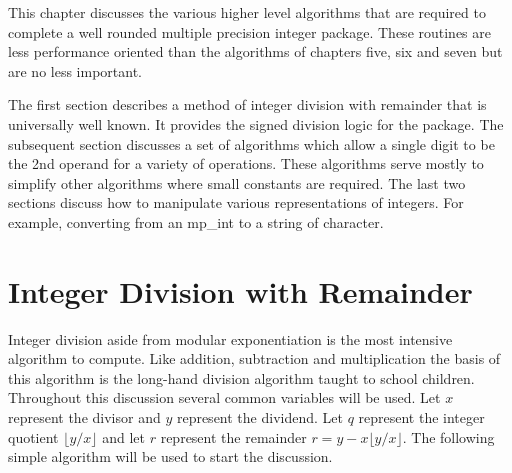 \documentclass[b5paper]{book}
\begin{document}
This chapter discusses the various higher level algorithms that are required to complete a well rounded multiple precision integer package.  These
routines are less performance oriented than the algorithms of chapters five, six and seven but are no less important.  

The first section describes a method of integer division with remainder that is universally well known.  It provides the signed division logic
for the package.  The subsequent section discusses a set of algorithms which allow a single digit to be the 2nd operand for a variety of operations.  
These algorithms serve mostly to simplify other algorithms where small constants are required.  The last two sections discuss how to manipulate 
various representations of integers.  For example, converting from an mp\_int to a string of character.

\section{Integer Division with Remainder}
\label{sec:division}

Integer division aside from modular exponentiation is the most intensive algorithm to compute.  Like addition, subtraction and multiplication
the basis of this algorithm is the long-hand division algorithm taught to school children.  Throughout this discussion several common variables
will be used.  Let $x$ represent the divisor and $y$ represent the dividend.  Let $q$ represent the integer quotient $\lfloor y / x \rfloor$ and 
let $r$ represent the remainder $r = y - x \lfloor y / x \rfloor$.  The following simple algorithm will be used to start the discussion.
\end{document}
